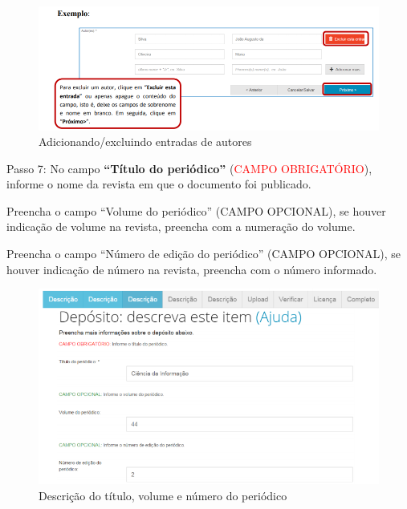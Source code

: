 \documentclass[12pt,hidelinks]{article}
\begin{document}
    \begin{figure}[!htp]
                \centering
                \includegraphics[scale=0.8]{figura/Figura145.png}
                \caption{Adicionando/excluindo entradas de autores}
            \label{Rotulo}
        \end{figure}
    
    Passo 7: No campo \textbf{“Título do periódico”} (\textcolor{red}{CAMPO OBRIGATÓRIO}), informe o nome da revista em que o documento foi publicado.
    
    \singlespacing
    
    Preencha o campo “Volume do periódico” (\textcolor{applegreen}{CAMPO OPCIONAL}), se houver indicação de volume na revista, preencha com a numeração do volume.
    
    \singlespacing
    
    Preencha o campo “Número de edição do periódico” (\textcolor{applegreen}{CAMPO OPCIONAL}), se houver indicação de número na revista, preencha com o número informado.

\newpage
    
    \begin{figure}[!htp]
                \centering
                \includegraphics[scale=0.8]{figura/Figura146.png}
                \caption{Descrição do título, volume e número do periódico}
            \label{Rotulo}
        \end{figure}
    
\end{document}
